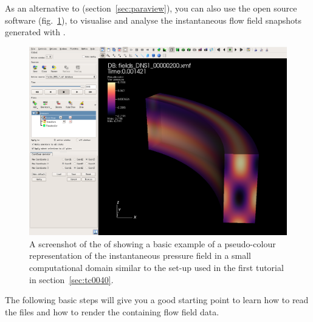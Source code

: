 \documentclass[a4paper, 11pt, DIV=11]{scrartcl}
\begin{document}
As an alternative to \paraview (section~\ref{sec:paraview}), you can also use
the open source software \visit (fig.~\ref{fig:visit}), to visualise and
analyse the instantaneous flow field snapshots generated with \nsc.
\begin{figure}[htb]
\includegraphics[width=1.00\linewidth]{figures/visit.png}
\caption{A screenshot of the  of \visit showing a basic example
of a pseudo-colour representation of the instantaneous pressure field in
a small computational domain similar to the set-up used in the first
tutorial in section~\ref{sec:tc0040}.}
\label{fig:visit}
\end{figure}
The following basic steps will give you a good starting point to learn
how to read the \hdf files and how to render the containing flow field
data.
\end{document}
